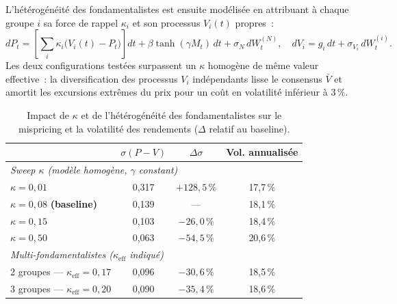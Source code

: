 L'hétérogénéité des fondamentalistes est ensuite modélisée en attribuant à chaque
groupe $i$ sa force de rappel $\kappa_i$ et son processus $V_i(t)$ propres~:
\[
  dP_t = \left[\sum_i \kappa_i\bigl(V_i(t) - P_t\bigr)\right]dt
        + \beta\tanh(\gamma M_t)\,dt + \sigma_N\,dW_t^{(N)},
        \quad dV_i = g_i\,dt + \sigma_{V_i}\,dW_t^{(i)}.
\]
Les deux configurations testées surpassent un $\kappa$ homogène de même valeur
effective~: la diversification des processus $V_i$ indépendants lisse le consensus
$\bar{V}$ et amortit les excursions extrêmes du prix pour un coût en volatilité
inférieur à $3\,\%$.

\begin{table}[h]
\centering\small
\begin{tabular}{lccc}
\hline
 & $\sigma(P-V)$ & $\Delta\sigma$ & Vol. annualisée \\
\hline
\multicolumn{4}{l}{\textit{Sweep $\kappa$ (modèle homogène, $\gamma$ constant)}} \\
$\kappa=0{,}01$ & 0,317 & $+128{,}5\,\%$ & 17,7\,\% \\
$\kappa=0{,}08$ \textbf{(baseline)} & 0,139 & — & 18,1\,\% \\
$\kappa=0{,}15$ & 0,103 & $-26{,}0\,\%$ & 18,4\,\% \\
$\kappa=0{,}50$ & 0,063 & $-54{,}5\,\%$ & 20,6\,\% \\
\hline
\multicolumn{4}{l}{\textit{Multi-fondamentalistes ($\kappa_{\mathrm{eff}}$ indiqué)}} \\
2 groupes — $\kappa_{\mathrm{eff}}=0{,}17$ & 0,096 & $-30{,}6\,\%$ & 18,5\,\% \\
3 groupes — $\kappa_{\mathrm{eff}}=0{,}20$ & 0,090 & $-35{,}4\,\%$ & 18,6\,\% \\
\hline
\end{tabular}
\caption{Impact de $\kappa$ et de l'hétérogénéité des fondamentalistes sur le
mispricing et la volatilité des rendements ($\Delta$ relatif au baseline).}
\label{tab:kappa_multi}
\end{table}
